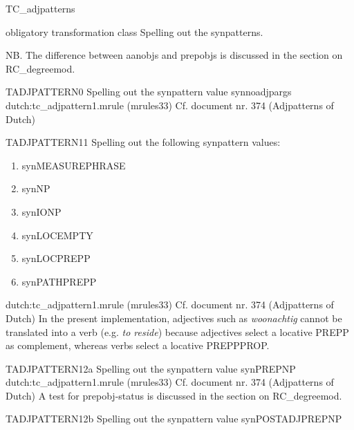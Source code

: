 \newpage
\begin{mruleclass}{TC\_adjpatterns}
\begin{classdescr}
\kind obligatory transformation class
\classtask Spelling out the synpatterns. 
\nofilters

\nospeedrules

\noplannedrules

\norulesnotince

\classremarks
NB. The difference between aanobjs and prepobjs is discussed 
in 
the section on RC\_degreemod.
\end{classdescr}

\begin{members}
\begin{member}
 TADJPATTERN0
 Spelling out the synpattern value synnoadjpargs
\file dutch:tc\_adjpattern1.mrule (mrules33)
\semantics \nosemantics
\example Cf. document nr. 374 (Adjpatterns of Dutch)
\remarks

\end{member}
\begin{member}
 TADJPATTERN11
 Spelling out the following synpattern values:
\begin{enumerate}
  \item synMEASUREPHRASE
  \item synNP
  \item synIONP
  \item synLOCEMPTY
  \item synLOCPREPP
  \item synPATHPREPP
\end{enumerate}

\file dutch:tc\_adjpattern1.mrule (mrules33)
\semantics \nosemantics
\example Cf. document nr. 374 (Adjpatterns of Dutch)
\remarks
In the present implementation,  adjectives such as 
{\em woonachtig} cannot be translated into a verb (e.g. {\em to reside})
because adjectives select a locative PREPP as complement, whereas 
verbs select a locative PREPPPROP. 

\end{member}
\begin{member}
 TADJPATTERN12a
 Spelling out the synpattern value synPREPNP
\file dutch:tc\_adjpattern1.mrule (mrules33)
\semantics \nosemantics
\example Cf. document nr. 374 (Adjpatterns of Dutch)
\remarks  A test for prepobj-status is discussed in 
the section on RC\_degreemod.
\end{member}
\begin{member}
 TADJPATTERN12b
 Spelling out the synpattern value synPOSTADJPREPNP



\end{member}
\end{members}
\end{mruleclass}
